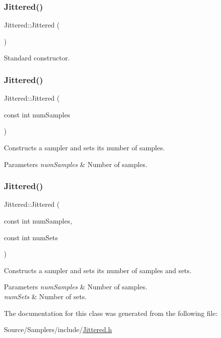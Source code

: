\subsubsection{\texorpdfstring{Jittered()}{Jittered()}\hspace{0.1cm}{\footnotesize\ttfamily [1/3]}}
{\footnotesize\ttfamily Jittered\+::\+Jittered (\begin{DoxyParamCaption}{ }\end{DoxyParamCaption})}

Standard constructor. \hypertarget{class_jittered_a140ae4562e7db9133bb1953e2f8e5ea8}{}\label{class_jittered_a140ae4562e7db9133bb1953e2f8e5ea8} 
\subsubsection{\texorpdfstring{Jittered()}{Jittered()}\hspace{0.1cm}{\footnotesize\ttfamily [2/3]}}
{\footnotesize\ttfamily Jittered\+::\+Jittered (\begin{DoxyParamCaption}\item[{const int}]{num\+Samples }\end{DoxyParamCaption})}

Constructs a sampler and sets its number of samples. 
\begin{DoxyParams}{Parameters}
{\em num\+Samples} & Number of samples. \\
\hline
\end{DoxyParams}
\hypertarget{class_jittered_a37413740ae17ca91a2dd02375a5683ce}{}\label{class_jittered_a37413740ae17ca91a2dd02375a5683ce} 
\subsubsection{\texorpdfstring{Jittered()}{Jittered()}\hspace{0.1cm}{\footnotesize\ttfamily [3/3]}}
{\footnotesize\ttfamily Jittered\+::\+Jittered (\begin{DoxyParamCaption}\item[{const int}]{num\+Samples,  }\item[{const int}]{num\+Sets }\end{DoxyParamCaption})}

Constructs a sampler and sets its number of samples and sets. 
\begin{DoxyParams}{Parameters}
{\em num\+Samples} & Number of samples. \\
\hline
{\em num\+Sets} & Number of sets. \\
\hline
\end{DoxyParams}


The documentation for this class was generated from the following file\+:\begin{DoxyCompactItemize}
\item 
Source/\+Samplers/include/\hyperlink{_jittered_8h}{Jittered.\+h}\end{DoxyCompactItemize}
